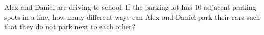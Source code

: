Alex and Daniel are driving to school. If the parking lot has $10$ adjacent parking spots in a line, how many different ways can Alex and Daniel park their cars such that they do not park next to each other?
